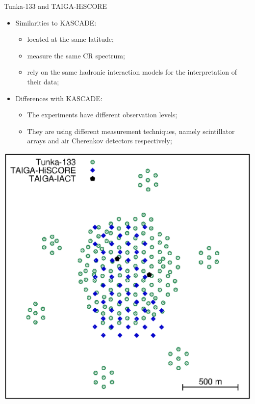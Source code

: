 
%

\begin{frame}{Tunka-133 and TAIGA-HiSCORE}
\begin{minipage}[c]{0.49\textwidth}
\begin{itemize}
  \item Similarities to KASCADE:
  \begin{itemize}
    \item located at the same latitude;
    \item measure the same CR spectrum;
    \item rely on the same hadronic interaction models for the interpretation of their data;
  \end{itemize}
  \item Differences with KASCADE:
  \begin{itemize}
    \item The experiments have different observation levels;
    \item They are using different measurement techniques, namely scintillator arrays and air Cherenkov detectors respectively;
  \end{itemize}
\end{itemize}
\end{minipage}
\hfill
\begin{minipage}[c]{0.5\textwidth}
\includegraphics[width=1.2\textwidth]{pics/map.eps}
\end{minipage}

\end{frame}

